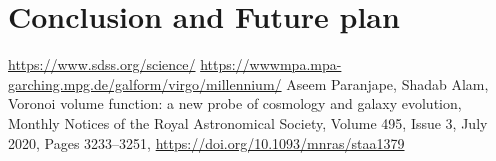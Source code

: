 \documentclass[12pt]{article}
\begin{document}
\section{Conclusion and Future plan}




\begin{thebibliography}{widest entry}
 \url{https://www.sdss.org/science/}
 \url{https://wwwmpa.mpa-garching.mpg.de/galform/virgo/millennium/}
 Aseem Paranjape, Shadab Alam, Voronoi volume function: a new probe of cosmology and galaxy evolution, Monthly Notices of the Royal Astronomical Society, Volume 495, Issue 3, July 2020, Pages 3233–3251, \url{https://doi.org/10.1093/mnras/staa1379}
\end{thebibliography}
\end{document}
